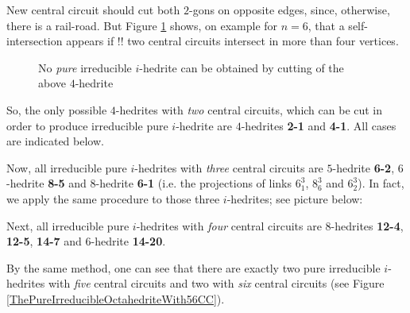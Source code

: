 \documentclass[12pt]{article}
\begin{document}
New central circuit should cut both $2$-gons on opposite edges, since, otherwise, there is a rail-road. But Figure \ref{Cutting4hedrite} shows, on example for $n=6$, that a self-intersection appears if !! two central circuits intersect in more than four vertices.


\begin{figure}
\centering
\epsfxsize=55mm
\caption{No {\em pure} irreducible $i$-hedrite can be obtained by cutting of the above $4$-hedrite}
\label{Cutting4hedrite}
\end{figure}



So, the only possible $4$-hedrites with {\em two} central circuits,
which can be cut in order to produce irreducible pure $i$-hedrite
are $4$-hedrites {\bf 2-1} and {\bf 4-1}. All cases are indicated below. 

\begin{center}
\epsfxsize=120mm
\end{center}

Now, all irreducible pure $i$-hedrites with {\em three} central circuits are $5$-hedrite {\bf 6-2}, $6$-hedrite {\bf 8-5} and $8$-hedrite {\bf 6-1} (i.e. the projections of links $6^3_1$, $8^3_6$ and $6^3_2$).
In fact, we apply the same procedure to those three $i$-hedrites; see picture below:

\begin{center}
\epsfxsize=150mm
\end{center}

Next, all irreducible pure $i$-hedrites with {\em four} central circuits are $8$-hedrites {\bf 12-4}, {\bf 12-5}, {\bf 14-7} and $6$-hedrite {\bf 14-20}.

By the same method, one can see that there are exactly two pure irreducible $i$-hedrites with {\em five} central circuits and two with {\em six} central circuits (see Figure \ref{ThePureIrreducibleOctahedriteWith56CC}).
\end{document}
